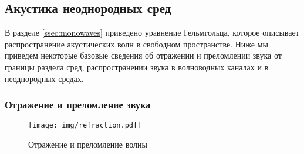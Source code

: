 

\newpage
\subsection{Акустика неоднородных сред}

В разделе \ref{ssec:monowaves} приведено уравнение Гельмгольца, которое описывает распространение акустических волн в свободном пространстве.  Ниже мы приведем некоторые базовые сведения об отражении и преломлении звука от границы раздела сред, распространении звука в волноводных каналах и в неоднородных средах.

\subsubsection{Отражение и преломление звука}

\begin{figure}[H]
	\centering
	\texttt{[image: img/refraction.pdf]}
	\caption{Отражение и преломление волны}
	\label{fig:refraction}
\end{figure}

